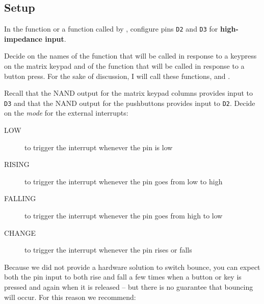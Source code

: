 \subsection{Setup}

In the  function or a function called by ,
configure pins \texttt{D2} and \texttt{D3} for \textbf{high-impedance input}.

Decide on the names of the function that will be called in response to a
keypress on the matrix keypad and of the function that will be called in
response to a button press. For the sake of discussion, I will call these
functions,  and .

Recall that the NAND output for the matrix keypad columns provides input to
\texttt{D3} and that the NAND output for the pushbuttons provides input to
\texttt{D2}. Decide on the \textit{mode} for the external interrupts:
    \begin{description}
    \item [LOW] to trigger the interrupt whenever the pin is low
    \item [RISING] to trigger the interrupt whenever the pin goes from low to
        high
    \item [FALLING] to trigger the interrupt whenever the pin goes from high to
        low
    \item [CHANGE] to trigger the interrupt whenever the pin rises or falls
    \end{description}
Because we did not provide a hardware solution to switch bounce, you can expect
both the pin input to both rise and fall a few times when a button or key is
pressed and again when it is released -- but there is no guarantee that
bouncing will occur. For this reason we recommend:
